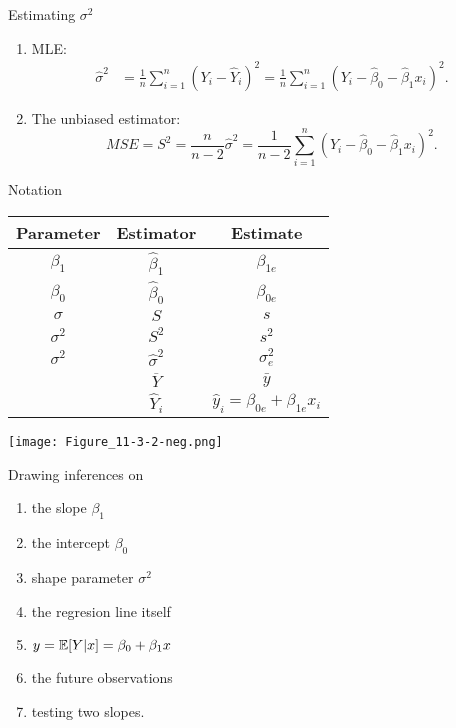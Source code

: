 \begin{frame}{Estimating $\sigma^2$}


\begin{enumerate}
\item MLE:
\begin{align*}
\hat\sigma^2 &=  \frac{1}{n}\sum_{i=1}^{n} \left(Y_i-\widehat Y_i \right)^2
=  \frac{1}{n}\sum_{i=1}^{n} \left(Y_i-\hat\beta_0 - \hat\beta_1 x_i \right)^2.
\end{align*}
\vfill
\item The unbiased estimator:
	\[
MSE = S^2 =  \frac{n}{n-2}\hat\sigma^2 =
  \frac{1}{n-2}\sum_{i=1}^{n} \left(Y_i-\hat\beta_0 - \hat\beta_1 x_i \right)^2.
	\]
\end{enumerate}
\end{frame}
\begin{frame}
\centering
Notation\\[1em]
\def\arraystretch{1.5}
\begin{tabular}{c|c|c}
\hline
Parameter &	Estimator & Estimate\\\hline
$\beta_1$ & $\hat\beta_1$ & $\beta_{1e}$\\
$\beta_0$ & $\hat\beta_0$ & $\beta_{0e}$\\
$\sigma$ & $S$ & $s$ \\
$\sigma^2$ & $S^2$ & $s^2$ \\
$\sigma^2$ &	$\hat\sigma^2$ & $\sigma^2_e$\\
&	$\overline{Y}$ & $\bar y$\\
&	$\widehat{Y}_i$ & $\hat y_i = \beta_{0e} +\beta_{1e} x_i$
\\\hline
\end{tabular}
\end{frame}
\begin{frame}
\centering
\texttt{[image: Figure\_11-3-2-neg.png]}
\begin{minipage}{0.38\textwidth}
Drawing inferences on
	\begin{enumerate}
		\item the slope $\beta_1$\\[1em]
		\item the  intercept $\beta_0$ \\[1em]
		\item shape parameter $\sigma^2$ \\[1em]
		\item the regresion line itself
		\item[] $y = \mathbb{E}[Y|x]=\beta_0+\beta_1 x$\\[1em]
		\item the future observations\\[1em]
		\item testing two slopes.
	\end{enumerate}
\end{minipage}
\end{frame}

